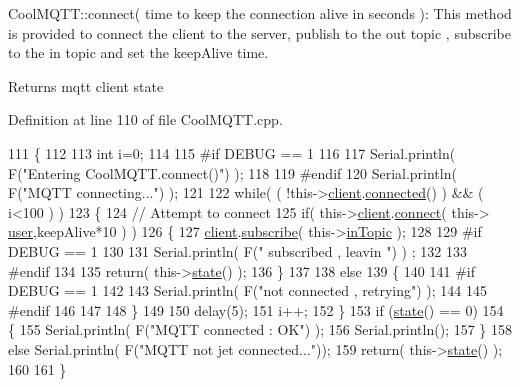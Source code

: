 Cool\+M\+Q\+T\+T\+::connect( time to keep the connection alive in seconds )\+: This method is provided to connect the client to the server, publish to the out topic , subscribe to the in topic and set the keep\+Alive time.

\begin{DoxyReturn}{Returns}
mqtt client state 
\end{DoxyReturn}


Definition at line 110 of file Cool\+M\+Q\+T\+T.\+cpp.


\begin{DoxyCode}
111 \{       
112 
113     \textcolor{keywordtype}{int} i=0;
114 
115 \textcolor{preprocessor}{#if DEBUG == 1 }
116 
117     Serial.println( F(\textcolor{stringliteral}{"Entering CoolMQTT.connect()"}) );
118 
119 \textcolor{preprocessor}{#endif}
120     Serial.println( F(\textcolor{stringliteral}{"MQTT connecting..."}) );
121     
122     \textcolor{keywordflow}{while}( ( !this->\hyperlink{class_cool_m_q_t_t_afed1372683c44893b4668d0f1771f514}{client}.\hyperlink{class_cool_pub_sub_client_a3d5a5da4ddb1e5c1bea64d80c665d148}{connected}() ) && ( i<100 ) ) 
123     \{
124         \textcolor{comment}{// Attempt to connect}
125         \textcolor{keywordflow}{if}( this->\hyperlink{class_cool_m_q_t_t_afed1372683c44893b4668d0f1771f514}{client}.\hyperlink{class_cool_pub_sub_client_a2664c2ebc302b2fa49f493a339ecc891}{connect}( this-> \hyperlink{class_cool_m_q_t_t_a8cd47e45d457f908d4b4390b35aaee83}{user},keepAlive*10  ) )
126         \{
127             \hyperlink{class_cool_m_q_t_t_afed1372683c44893b4668d0f1771f514}{client}.\hyperlink{class_cool_pub_sub_client_ac1ebc9ad874128aefa985d78496d2e8f}{subscribe}( this->\hyperlink{class_cool_m_q_t_t_a4492f52a441e83cc5151010317fdb52d}{inTopic} );
128 
129 \textcolor{preprocessor}{        #if DEBUG == 1 }
130 
131             Serial.println( F(\textcolor{stringliteral}{" subscribed , leavin "}) ) ;
132         
133 \textcolor{preprocessor}{        #endif}
134 
135             \textcolor{keywordflow}{return}( this->\hyperlink{class_cool_m_q_t_t_a5d003307eff78efbd585e42b43b72b6d}{state}() );
136         \}
137 
138         \textcolor{keywordflow}{else}
139         \{
140         
141 \textcolor{preprocessor}{        #if DEBUG == 1 }
142 
143             Serial.println( F(\textcolor{stringliteral}{"not connected , retrying"}) );
144         
145 \textcolor{preprocessor}{        #endif}
146 
147             
148         \}
149 
150     delay(5);
151     i++;
152     \}
153     \textcolor{keywordflow}{if} (\hyperlink{class_cool_m_q_t_t_a5d003307eff78efbd585e42b43b72b6d}{state}() == 0)
154     \{
155         Serial.println( F(\textcolor{stringliteral}{"MQTT connected : OK"}) );
156         Serial.println();
157     \}
158     \textcolor{keywordflow}{else} Serial.println( F(\textcolor{stringliteral}{"MQTT not jet connected..."}));
159     \textcolor{keywordflow}{return}( this->\hyperlink{class_cool_m_q_t_t_a5d003307eff78efbd585e42b43b72b6d}{state}() );
160 
161 \}
\end{DoxyCode}
